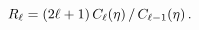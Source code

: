 \[R_{\ell}=(2\ell+1)\mathop{C_{\ell}\/}\nolimits\!\left(\eta\right)/\mathop{C_{%
\ell-1}\/}\nolimits\!\left(\eta\right).\]
